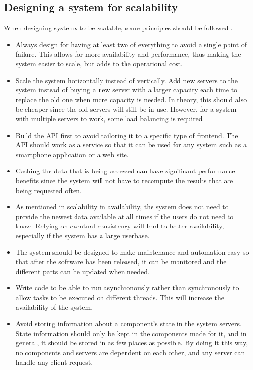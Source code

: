 \subsection{Designing a system for scalability}
When designing systems to be scalable, some principles should be followed \cite{ScalabilityDesignPrinciples}.
\begin{itemize}
    \item Always design for having at least two of everything to avoid a single point of failure. 
    This allows for more availability and performance, thus making the system easier to scale, but adds to the operational cost.
    \item Scale the system horizontally instead of vertically.
    Add new servers to the system instead of buying a new server with a larger capacity each time to replace the old one when more capacity is needed. 
    In theory, this should also be cheaper since the old servers will still be in use. However, for a system with multiple servers to work, some load balancing is required.
    \item Build the API first to avoid tailoring it to a specific type of frontend. 
    The API should work as a service so that it can be used for any system such as a smartphone application or a web site. 
    \item Caching the data that is being accessed can have significant performance benefits since the system will not have to recompute the results that are being requested often. 
    \item As mentioned in scalability in availability, the system does not need to provide the newest data available at all times if the users do not need to know. 
    Relying on eventual consistency will lead to better availability, especially if the system has a large userbase.
    \item The system should be designed to make maintenance and automation easy so that after the software has been released, it can be monitored and the different parts can be updated when needed.
    \item Write code to be able to run asynchronously rather than synchronously to allow tasks to be executed on different threads. This will increase the availability of the system.
    \item Avoid storing information about a component's state in the system servers. 
    State information should only be kept in the components made for it, and in general, it should be stored in as few places as possible. 
    By doing it this way, no components and servers are dependent on each other, and any server can handle any client request. 
\end{itemize}
